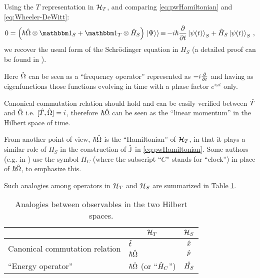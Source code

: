 
Using the $T$ representation in $\mathcal{H}_T$,
and comparing \eqref{eq:pwHamiltonian} and \eqref{eq:Wheeler-DeWitt}:
\begin{equation}\label{eq:schrod_from_pw}
  0 = \qty(\hbar\op{\Omega}\ox\idop_S + \idop_{T}\ox\op{H}_S)\dket{\Psi}
    \repr -i\hbar\pdv{t}\ket{\psi(t)}_{S} + \op{H}_S\ket{\psi(t)}_{S}
    \,\text{,}
\end{equation}
we recover the usual form of the Schr\"{o}dinger equation in $H_S$
(a detailed proof can be found in \cite[709--710]{Wootters:Loyola}).

Here $\hat{\Omega}$ can be seen as a ``frequency operator''
represented as $-i\pdv{t}$ and having as eigenfunctions
those functions evolving in time with a phase factor $e^{i \omega t}$ only.

Canonical commutation relation should hold and can be easily verified
between $\hat{T}$ and $\hat{\Omega}$
i.e. $[\hat{T}, \hat{\Omega}] = i$,
therefore $\hbar\hat{\Omega}$ can be seen as the ``linear momentum''
in the Hilbert space of time.

From another point of view, $\hbar\hat{\Omega}$ is the ``Hamiltonian'' of $\mathcal{H}_T$,
in that it plays a similar role of $H_S$ in the construction of
$\hat{\mathbb{J}}$ in \eqref{eq:pwHamiltonian}. Some authors (e.g. in \citereset\cite{Wootters:Loyola})
use the symbol $H_C$ (where the subscript ``$C$'' stands for ``clock'') in place of
$\hbar\hat{\Omega}$, to emphasize this.

Such analogies among operators in $\mathcal{H}_T$ and $\mathcal{H}_S$ are summarized in Table \ref{tbl:op_comparison_pw}.

{
  \begin{table}
    \centering
    \begin{tabular}{l|l|c}
      & \multicolumn{1}{c|}{$\mathcal{H}_T$}   & \multicolumn{1}{|c}{$\mathcal{H}_S$}   \\
      \hline
      \multirow{2}{11em}{Canonical commutation relation} 
      & $\hat{t}$                                & $\hat{x}$                            \\
      & $\hbar\hat{\Omega}$                      & $\hat{p}$                            \\
      \hline
      ``Energy operator''
      & $\hbar\hat{\Omega}$ (or ``$\hat{H}_C$'')  & $\hat{H_S}$
    \end{tabular}
    {\caption{
      Analogies between observables in the two Hilbert spaces.
    }\label{tbl:op_comparison_pw}}
  \end{table}
}

